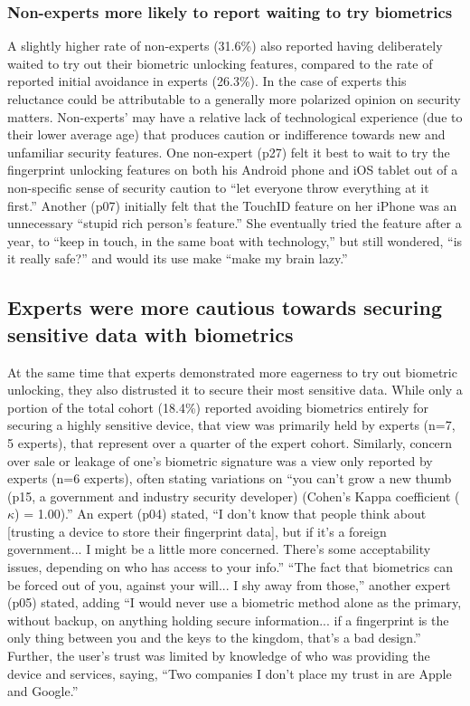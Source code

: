 \subsubsection{Non-experts more likely to report waiting to try biometrics}
A slightly higher rate of non-experts (31.6\%) also reported having deliberately
waited to try out their biometric unlocking features, compared to the rate of
reported initial avoidance in experts (26.3\%). In the case of experts this
reluctance could be attributable to a generally more polarized opinion on
security matters. Non-experts' may have a relative lack of technological
experience (due to their lower average age) that produces caution or
indifference towards new and unfamiliar security features.  One non-expert (p27)
felt it best to wait to try the fingerprint unlocking features on both his
Android phone and iOS tablet out of a non-specific sense of security caution to
``let everyone throw everything at it first.'' Another (p07) initially felt that
the TouchID feature on her iPhone was an unnecessary ``stupid rich person's
feature.''
She eventually tried the feature after a year, to ``keep in touch, in the same boat with technology,'' but still wondered, ``is it really safe?'' and would its use make ``make my brain lazy.''

\subsection{Experts were more cautious towards securing sensitive data with biometrics}
At the same time that experts demonstrated more eagerness to try out biometric unlocking, they also distrusted it to secure their most sensitive data. While only a portion of the total cohort (18.4\%) reported avoiding biometrics entirely for securing a highly sensitive device, that view was primarily held by experts (n=7, 5 experts), that represent over a quarter of the expert cohort. Similarly, concern over sale or leakage of one's biometric signature was a view only reported by experts (n=6 experts), often stating variations on ``you can't grow a new thumb (p15, a government and industry security developer) (Cohen's Kappa coefficient (\(\kappa\)) = 1.00).'' An expert (p04) stated, ``I don't know that people think about [trusting a device to store their fingerprint data], but if it's a foreign government... I might be a little more concerned. There's some acceptability issues, depending on who has access to your info.'' ``The fact that biometrics can be forced out of you, against your will... I shy away from those,'' another expert (p05) stated, adding ``I would never use a biometric method alone as the primary, without backup, on anything holding secure information... if a fingerprint is the only thing between you and the keys to the kingdom, that's a bad design.'' Further, the user's trust was limited by knowledge of who was providing the device and services, saying, ``Two companies I don't place my trust in are Apple and Google.'' 

